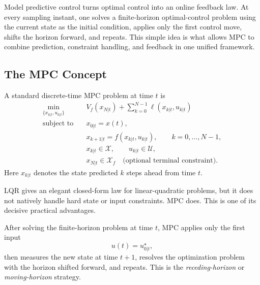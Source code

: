\label{lec:l9}

\begin{intuition}
	Model predictive control turns optimal control into an online feedback law. At every sampling instant, one solves a finite-horizon optimal-control problem using the current state as the initial condition, applies only the first control move, shifts the horizon forward, and repeats. This simple idea is what allows MPC to combine prediction, constraint handling, and feedback in one unified framework.
\end{intuition}

\subsection{The MPC Concept}
\label{sec:l9-the-mpc-concept}

\begin{definition}\label{def:l9-discrete-time-mpc-problem-formulation}
	A standard discrete-time MPC problem at time $t$ is
	\begin{align*}
		\min_{\{x_{k|t},u_{k|t}\}} \quad &
		V_f(x_{N|t}) + \sum_{k=0}^{N-1}\ell(x_{k|t},u_{k|t}) \\
		\text{subject to}\quad &
		x_{0|t}=x(t), \\
		&
		x_{k+1|t}=f(x_{k|t},u_{k|t}), \qquad k=0,\dots,N-1, \\
		&
		x_{k|t}\in \mathcal{X},
		\qquad
		u_{k|t}\in \mathcal{U}, \\
		&
		x_{N|t}\in \mathcal{X}_f \quad \text{(optional terminal constraint)}.
	\end{align*}
	Here $x_{k|t}$ denotes the state predicted $k$ steps ahead from time $t$.
\end{definition}

\begin{remark}
	LQR gives an elegant closed-form law for linear-quadratic problems, but it does not natively handle hard state or input constraints. MPC does. This is one of its decisive practical advantages.
\end{remark}

\begin{definition}\label{def:l9-receding-horizon-strategy}
	After solving the finite-horizon problem at time $t$, MPC applies only the first input
	\[
		u(t)=u_{0|t}^\star,
	\]
	then measures the new state at time $t+1$, resolves the optimization problem with the horizon shifted forward, and repeats. This is the \emph{receding-horizon} or \emph{moving-horizon} strategy.
\end{definition}

